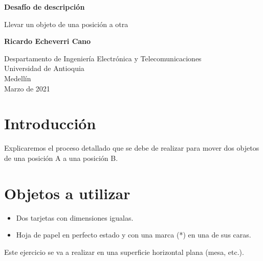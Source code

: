 \documentclass{article}
\begin{document}
\begin{titlepage}
    \begin{center}
        \vspace*{1cm}
            
        \Huge
        \textbf{Desafío de descripción}
            
        \vspace{0.5cm}
        \LARGE
        Llevar un objeto de una posición a otra
            
        \vspace{1.5cm}
            
        \textbf{Ricardo Echeverri Cano}
            
        \vfill
            
        \vspace{0.8cm}
            
        \Large
        Despartamento de Ingeniería Electrónica y Telecomunicaciones\\
        Universidad de Antioquia\\
        Medellín\\
        Marzo de 2021
            
    \end{center}
\end{titlepage}

\tableofcontents
\newpage
\section{Introducción}\label{intro}
Explicaremos el proceso detallado que se debe de realizar para mover dos objetos de una posición A a una posición B.

\section{Objetos a utilizar} \label{objetos}
\begin{itemize}
    \item Dos tarjetas con dimensiones igualas.
    \item Hoja de papel en perfecto estado y con una marca (*) en una de sus caras.
\end{itemize}
Este ejercicio se va a realizar en una superficie horizontal plana (mesa, etc.).
\end{document}

